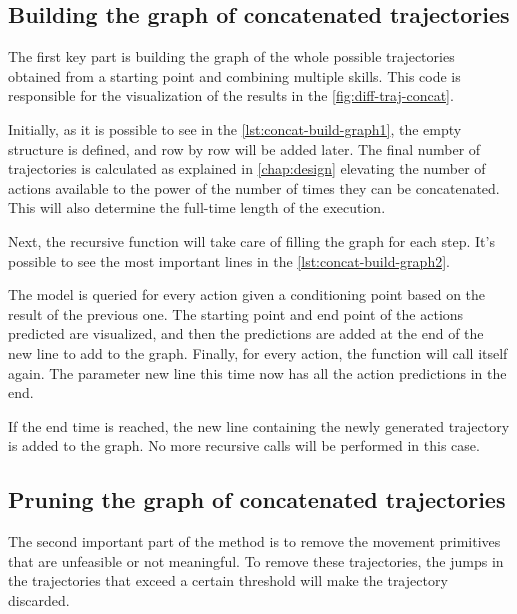 \subsection{Building the graph of concatenated trajectories} 
The first key part is building the graph of the whole possible trajectories obtained from a starting point and combining multiple skills. This code is responsible for the visualization of the results in the \cref{fig:diff-traj-concat}. 

Initially, as it is possible to see in the \cref{lst:concat-build-graph1}, the empty structure is defined, and row by row will be added later. The final number of trajectories is calculated as explained in \cref{chap:design} elevating the number of actions available to the power of the number of times they can be concatenated. This will also determine the full-time length of the execution. 



Next, the recursive function will take care of filling the graph for each step. It's possible to see the most important lines in the \cref{lst:concat-build-graph2}. 

The model is queried for every action given a conditioning point based on the result of the previous one. The starting point and end point of the actions predicted are visualized, and then the predictions are added at the end of the new line to add to the graph. Finally, for every action, the function will call itself again. The parameter new line this time now has all the action predictions in the end. 



If the end time is reached, the new line containing the newly generated trajectory is added to the graph. No more recursive calls will be performed in this case.

\subsection{Pruning the graph of concatenated trajectories}
The second important part of the method is to remove the movement primitives that are unfeasible or not meaningful. To remove these trajectories, the jumps in the trajectories that exceed a certain threshold will make the trajectory discarded.

